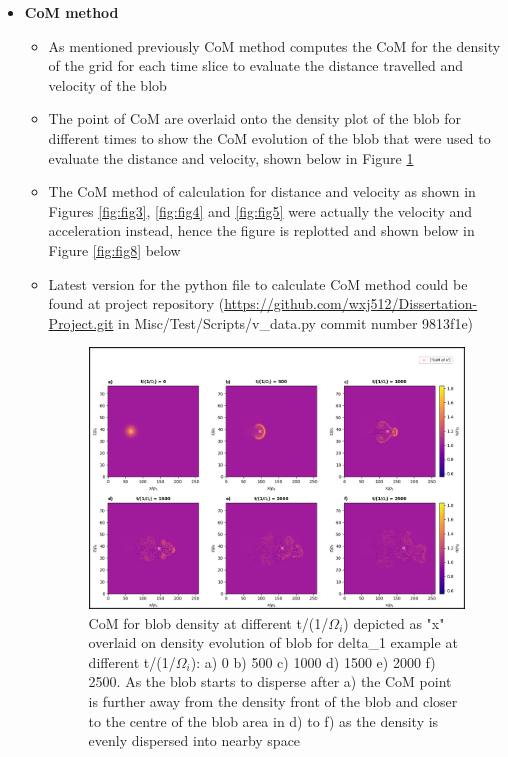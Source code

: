 \documentclass{article}
\begin{document}
\begin{arrowlist}
\begin{itemize}
            \item \textbf{CoM method}
            \begin{itemize}
                \item As mentioned previously CoM method computes the CoM for the density of the grid for each time slice to evaluate the distance travelled and velocity of the blob
                \item The point of CoM are overlaid onto the density plot of the blob for different times to show the CoM evolution of the blob that were used to evaluate the distance and velocity, shown below in Figure \ref{fig:fig7}
                \item The CoM method of calculation for distance and velocity as shown in Figures \ref{fig:fig3}, \ref{fig:fig4} and \ref{fig:fig5} were actually the velocity and acceleration instead, hence the figure is replotted and shown below in Figure \ref{fig:fig8} below
                \item Latest version for the python file to calculate CoM method could be found at project repository (\url{https://github.com/wxj512/Dissertation-Project.git} in Misc/Test/Scripts/v\_data.py commit number 9813f1e)  

    \begin{figure}
        \centering
        \includegraphics[width=\textwidth]{./Fig/Fig7 vel n CoM hmap t0_t50}
        \normalsize{\caption{CoM for blob density at different t/(1/$\Omega_i$) depicted as "x" overlaid on density evolution of blob for delta\_1 example at different t/(1/$\Omega_i$): a) 0 b) 500 c) 1000 d) 1500 e) 2000 f) 2500. As the blob starts to disperse after a) the CoM point is further away from the density front of the blob and closer to the centre of the blob area in d) to f) as the density is evenly dispersed into nearby space}
        \label{fig:fig7}}
    \end{figure}   


\end{itemize}
\end{itemize}
\end{arrowlist}
\end{document}
